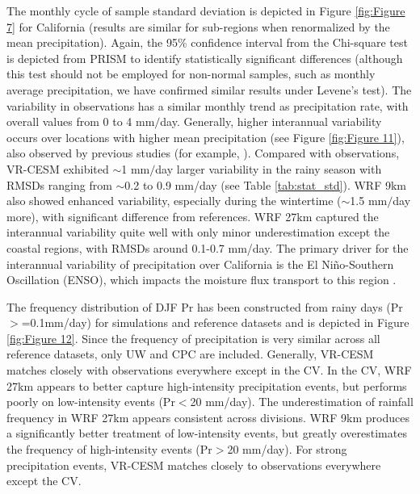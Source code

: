 \documentclass[ms,draft]{agutex}   %
\begin{document}
\begin{article}
The monthly cycle of sample standard deviation is depicted in Figure \ref{fig:Figure 7} for California (results are similar for sub-regions when renormalized by the mean precipitation).  Again, the 95\% confidence interval from the Chi-square test is depicted from PRISM to identify statistically significant differences (although this test should not be employed for non-normal samples, such as monthly average precipitation, we have confirmed similar results under Levene's test). The variability in observations has a similar monthly trend as precipitation rate, with overall values from 0 to 4 mm$/$day.  Generally, higher interannual variability occurs over locations with higher mean precipitation (see Figure \ref{fig:Figure 11}), also observed by previous studies (for example, \cite{duffy2006simulations}). Compared with observations, VR-CESM exhibited $\sim$1 mm$/$day larger variability in the rainy season with RMSDs ranging from $\sim$0.2 to 0.9 mm/day (see Table \ref{tab:stat_std}). WRF 9km also showed enhanced variability, especially during the wintertime ($\sim$1.5 mm$/$day more), with significant difference from references. WRF 27km captured the interannual variability quite well with only minor underestimation except the coastal regions, with RMSDs around 0.1-0.7 mm/day. The primary driver for the interannual variability of precipitation over California is the El Ni\~{n}o-Southern Oscillation (ENSO), which impacts the moisture flux transport to this region \citep{cayan1998decadal, cayan1999enso, leung2003hydroclimate2}.


The frequency distribution of DJF Pr has been constructed from rainy days (Pr$>$=0.1mm/day) for simulations and reference datasets and is depicted in Figure \ref{fig:Figure 12}.  Since the frequency of precipitation is very similar across all reference datasets, only UW and CPC are included. Generally, VR-CESM matches closely with observations everywhere except in the CV. In the CV, WRF 27km appears to better capture high-intensity precipitation events, but performs poorly on low-intensity events (Pr$<$20 mm/day). The underestimation of rainfall frequency in WRF 27km appears consistent across divisions. WRF 9km produces a significantly better treatment of low-intensity events, but greatly overestimates the frequency of high-intensity events (Pr$>$20 mm/day). For strong precipitation events, VR-CESM matches closely to observations everywhere except the CV.


\end{article}
\end{document}
